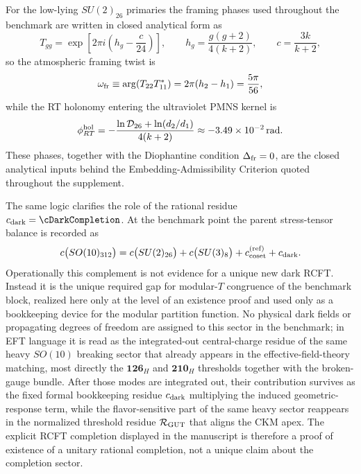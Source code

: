 \documentclass[11pt]{article}
\begin{document}
For the low-lying $SU(2)_{26}$ primaries the framing phases used throughout the benchmark are written in closed analytical form as
\begin{equation}
 T_{gg}=\exp\!\left[2\pi i\left(h_g-\frac{c}{24}\right)\right],
 \qquad
 h_g=\frac{g(g+2)}{4(k+2)},
 \qquad
 c=\frac{3k}{k+2},
\end{equation}
so the atmospheric framing twist is
\begin{equation}
 \omega_{\rm fr}
 \equiv
 \arg\!\left(T_{22}T_{11}^{*}\right)
 =2\pi(h_2-h_1)
 =\frac{5\pi}{56},
\end{equation}
while the RT holonomy entering the ultraviolet PMNS kernel is
\begin{equation}
 \phi_{RT}^{\rm hol}
 =
 -\frac{\ln \mathcal D_{26}+\ln(d_2/d_1)}{4(k+2)}
 \approx -3.49\times10^{-2}\,\mathrm{rad}.
\end{equation}
These phases, together with the Diophantine condition $\Delta_{\rm fr}=0$, are the closed analytical inputs behind the Embedding-Admissibility Criterion quoted throughout the supplement.

The same logic clarifies the role of the rational residue
$c_{\rm dark}=\cDarkCompletion$. At the benchmark point the parent stress-tensor
balance is recorded as
\begin{equation}
 c\bigl(SO(10)_{312}\bigr)
 =
 c\bigl(SU(2)_{26}\bigr)
 + c\bigl(SU(3)_8\bigr)
 + c_{\rm coset}^{\rm(ref)}
 + c_{\rm dark}.
\end{equation}
Operationally this complement is not evidence for a unique
new dark RCFT. Instead it is the unique required gap for modular-$T$
congruence of the benchmark block, realized here only at the level of an
existence proof and used only as a bookkeeping device for the modular
partition function. No physical dark fields or propagating degrees of freedom
are assigned to this sector in the benchmark; in EFT language it is read as the
integrated-out central-charge residue of the same heavy $SO(10)$ breaking
sector that already appears in the effective-field-theory matching, most
directly the $\mathbf{126}_H$ and $\mathbf{210}_H$ thresholds together with the
broken-gauge bundle. After those modes are integrated out, their contribution
survives as the fixed formal bookkeeping residue $c_{\rm dark}$ multiplying the induced
geometric-response term, while the flavor-sensitive part of the same heavy
sector reappears in the normalized threshold residue $\mathcal R_{\rm GUT}$ that
aligns the CKM apex. The explicit RCFT completion displayed in the manuscript
is therefore a proof of existence of a unitary rational completion, not a
unique claim about the completion sector.
\end{document}
